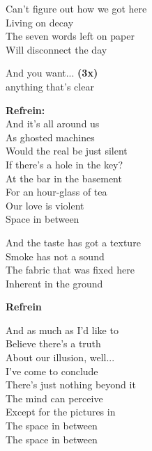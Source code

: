 Can't figure out how we got here\\
Living on decay\\
The seven words left on paper\\
Will disconnect the day

And you want... \textbf{(3x)}\\
anything that's clear

\textbf{Refrein:}\\
And it's all around us\\
As ghosted machines\\
Would the real be just silent\\
If there's a hole in the key?\\
At the bar in the basement\\
For an hour-glass of tea\\
Our love is violent\\
Space in between

And the taste has got a texture\\
Smoke has not a sound\\
The fabric that was fixed here\\
Inherent in the ground

\textbf{Refrein}

And as much as I'd like to\\
Believe there's a truth\\
About our illusion, well...\\
I've come to conclude\\
There's just nothing beyond it\\
The mind can perceive\\
Except for the pictures in\\
The space in between\\
The space in between
